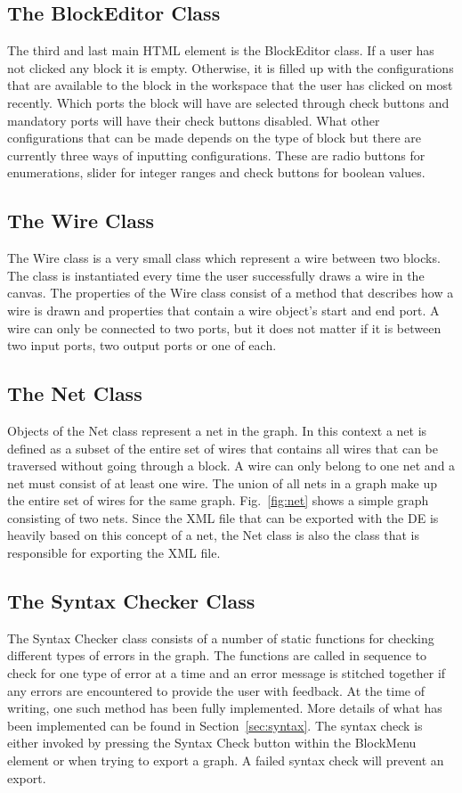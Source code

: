 \documentclass[journal,comsoc]{IEEEtran}
\begin{document}
\subsection{The BlockEditor Class}
The third and last main HTML element is the BlockEditor class. If a user has not clicked any block
it is empty. Otherwise, it is filled up with the configurations that are available to the block in
the workspace that the user has clicked on most recently. Which ports the block will have are
selected through check buttons and mandatory ports will have their check buttons disabled. What
other configurations that can be made depends on the type of block but there are currently three
ways of inputting configurations. These are radio buttons for enumerations, slider for integer
ranges and check buttons for boolean values.

\subsection{The Wire Class}
The Wire class is a very small class which represent a wire between two blocks. The class is
instantiated every time the user successfully draws a wire in the canvas. The properties of
the Wire class consist of a method that describes how a wire is drawn and properties that
contain a wire object's start and end port. A wire can only be connected to two ports, but it
does not matter if it is between two input ports, two output ports or one of each.

\subsection{The Net Class}
Objects of the Net class represent a net in the graph. In this context a net is defined as a subset
of the entire set of wires that contains all wires that can be traversed without going through a
block. A wire can only belong to one net and a net must consist of at least one wire. The union of
all nets in a graph make up the entire set of wires for the same graph. Fig.~\ref{fig:net}
shows a simple graph consisting of two nets. Since the XML file that can be exported with the DE
is heavily based on this concept of a net, the Net class is also the class that is responsible
for exporting the XML file.

\subsection{The Syntax Checker Class}
The Syntax Checker class consists of a number of static functions for checking different types
of errors in the graph. The functions are called in sequence to check for one type of error
at a time and an error message is stitched together if any errors are encountered to provide
the user with feedback. At the time of writing, one such method has been fully implemented.
More details of what has been implemented can be found in Section~\ref{sec:syntax}. The
syntax check is either invoked by pressing the Syntax Check button within the BlockMenu
element or when trying to export a graph. A failed syntax check will prevent an export.
\end{document}

